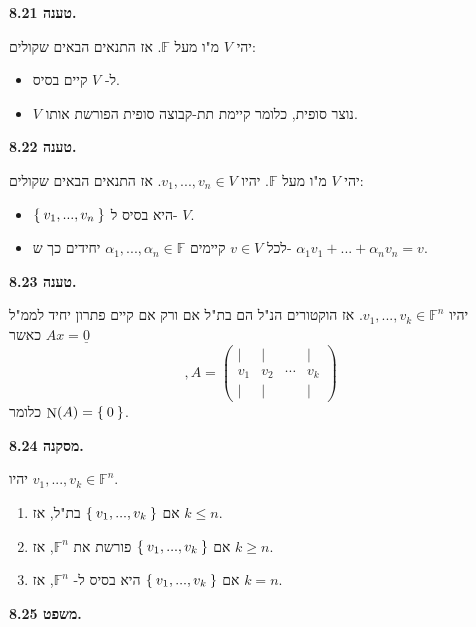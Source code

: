 \documentclass[12pt]{report}
\theoremstyle{plain}
\theoremstyle{definition}
\newcommand{\F}{\mathbb{F}}
\newcommand{\0}{\mathbf{0}}
\DeclareMathOperator{\Null}{N}
\begin{document}
\noindent\textbf{טענה 8.21.}

יהי 
$V$
מ"ו מעל
$\F$.
אז התנאים הבאים שקולים:
\begin{itemize}
\item
ל-
$V$
קיים בסיס.
\item
$V$
נוצר סופית, כלומר קיימת תת-קבוצה סופית הפורשת אותו.
\end{itemize}
\bigskip
\bigskip

\noindent\textbf{טענה 8.22.}

יהי
$V$
מ"ו מעל
$\F$. 
יהיו 
$v_1,...,v_n\in V$.
אז התנאים הבאים שקולים:
\begin{itemize}
\item 
$\Set{v_1,...,v_n}$
היא בסיס ל-
$V$.
\item 
לכל 
$v\in V$
קיימים
$\alpha_1,...,\alpha_n\in\F$
יחידים כך ש-
$\alpha_1v_1+...+\alpha_nv_n=v$.
\end{itemize}
\bigskip
\bigskip

\noindent\textbf{טענה 8.23.}

יהיו 
$v_1,...,v_k\in\F^n$.
אז הוקטורים הנ"ל הם בת"ל אם ורק אם קיים פתרון יחיד לממ"ל
$Ax=\underline{0}$
כאשר
$$
,A=\begin{pmatrix}
| & | & & | \\
v_1 & v_2 & \cdots & v_k \\
| & | & & |
\end{pmatrix}
$$
כלומר
$\Null(A)=\Set{0}$.
\bigskip
\bigskip

\noindent\textbf{מסקנה 8.24.}

יהיו 
$v_1,...,v_k\in\F^n$.
\begin{enumerate}[label=\alph*.]
\item 
אם 
$\Set{v_1,...,v_k}$
בת"ל, אז
$k\leq n$.
\item 
אם
$\Set{v_1,...,v_k}$
פורשת את
$\F^n$,
אז
$k\geq n$.
\item
אם
$\Set{v_1,...,v_k}$
היא בסיס ל-
$\F^n$,
אז
$k=n$.
\end{enumerate}
\bigskip
\bigskip

\noindent\textbf{משפט 8.25.}
\end{document}
